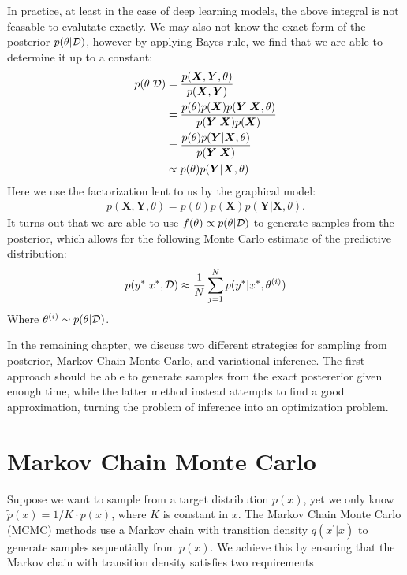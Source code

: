 In practice, at least in the case of deep learning models, the above integral is not feasable to evalutate exactly. We may also not know the exact form of the posterior $p(\theta|\mathcal{D})$, however by applying Bayes rule, we find that we are able to determine it up to a constant:
\begin{align*}
    p(\theta | \mathcal{D}) 
    &= \frac{p(\bm X , \bm Y, \theta)}{p(\bm{X}, \bm{Y})}\\
    &= \frac{p(\theta) p(\bm X) p(\bm Y | \bm X, \theta)}{p(\bm{Y}|\bm{X})p(\bm{X})} \\
    &= \frac{p(\theta) p(\bm Y | \bm X, \theta)}{p(\bm{Y}|\bm{X})} \\
    &\propto p(\theta) p(\bm Y | \bm X, \theta)
\end{align*}
Here we use the factorization lent to us by the graphical model:
\begin{align*}
    p(\bm X, \bm Y, \theta) = p(\theta) p(\bm X) p(\bm Y | \bm X, \theta).
\end{align*}
It turns out that we are able to use $f(\theta) \propto p(\theta | \mathcal{D})$ to generate samples from the posterior, which allows for the following Monte Carlo estimate of the predictive distribution:
\begin{align*}
    p(y^\ast | x^\ast, \mathcal{D})  \approx \frac{1}{N} \sum_{j=1}^N p(y^\ast | x^\ast, \theta^{(i)}) 
\end{align*}
Where $\theta^{(i)}\sim p(\theta | \mathcal{D})$.

In the remaining chapter, we discuss two different strategies for sampling from posterior, Markov Chain Monte Carlo, and variational inference. The first approach should be able to generate samples from the exact postererior given enough time, while the latter method instead attempts to find a good approximation, turning the problem of inference into an optimization problem.

\section{Markov Chain Monte Carlo}
Suppose we want to sample from a target distribution $p(x)$, yet we only know $\tilde{p}(x) = 1/K\cdot p(x)$, where $K$ is constant in $x$.
The Markov Chain Monte Carlo (MCMC) methods use a Markov chain with transition density $q(x^\prime | x)$ to generate samples sequentially from $p(x)$. 
We achieve this by ensuring that the Markov chain with transition density satisfies two requirements

